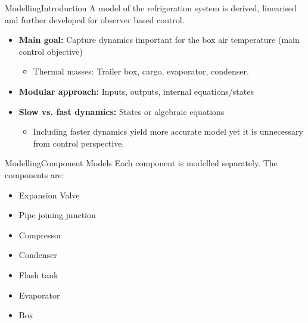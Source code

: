 \begin{frame}{Modelling}{Introduction}
	A model of the refrigeration system is derived, linearised and further developed for observer based control.
	\begin{itemize}
		\item \textbf{Main goal:} Capture dynamics important for the box air temperature (main control objective)
		\begin{itemize}
			\item Thermal masses: Trailer box, cargo, evaporator, condenser.
		\end{itemize}
		\item \textbf{Modular approach:} Inputs, outputs, internal equations/states
		\item \textbf{Slow vs. fast dynamics:} States or algebraic equations
		\begin{itemize}
			\item Including faster dynamics yield more accurate model yet it is unnecessary from control perspective.
		\end{itemize}		
	\end{itemize}
\end{frame}




\begin{frame}{Modelling}{Component Models}
	Each component is modelled separately. The components are:
	\begin{itemize}
		\item Expansion Valve
		\item Pipe joining junction
		\item Compressor
		\item Condenser
		\item Flash tank
		\item Evaporator
		\item Box
	\end{itemize}
\end{frame}




